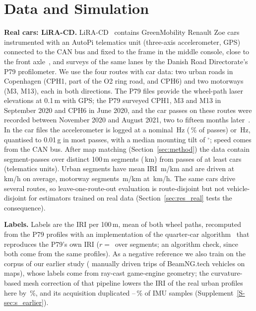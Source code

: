 \section{Data and Simulation}
\label{sec:data}

\textbf{Real cars: LiRA-CD.}
LiRA-CD~\cite{skar2023lira,lira_data} contains GreenMobility Renault Zoe cars instrumented with an AutoPi telematics unit (three-axis accelerometer, GPS) connected to the CAN bus and fixed to the frame in the middle console, close to the front axle~\cite{skar2023lira}, and surveys of the same lanes by the Danish Road Directorate's P79 profilometer.
We use the four routes with car data: two urban roads in Copenhagen (CPH1, part of the O2 ring road, and CPH6) and two motorways (M3, M13), each in both directions.
The P79 files provide the wheel-path laser elevations at 0.1\,m with GPS; the P79 surveyed CPH1, M3 and M13 in September 2020 and CPH6 in June 2020, and the car passes on these routes were recorded between November 2020 and August 2021, two to fifteen months later~\cite{lira_data}.
In the car files the accelerometer is logged at a nominal \liraRateLow\,Hz (\liraRateLowShare\,\% of passes) or \liraRateHigh\,Hz, quantised to 0.01\,g in most passes, with a median mounting tilt of \liraTiltMedian$^\circ$; speed comes from the CAN bus.
After map matching (Section~\ref{sec:method}) the data contain \liraUnits{} segment-passes over \liraSegments{} distinct 100\,m segments (\liraKm\,km) from \liraPasses{} passes of at least \liraDevices{} cars (telematics units).
Urban segments have mean IRI \liraIriUrban\,m/km and are driven at \liraSpeedUrban\,km/h on average, motorway segments \liraIriMotorway\,m/km at \liraSpeedMotorway\,km/h.
The same cars drive several routes, so leave-one-route-out evaluation is route-disjoint but not vehicle-disjoint for estimators trained on real data (Section~\ref{sec:res_real} tests the consequence).

\textbf{Labels.}
Labels are the IRI per 100\,m, mean of both wheel paths, recomputed from the P79 profiles with an implementation of the quarter-car algorithm~\cite{sayers1995iri,astm_e1926} that reproduces the P79's own IRI ($r=$\,\iriValR{} over \iriValN{} segments; an algorithm check, since both come from the same profiles).
As a negative reference we also train on the corpus of our earlier study (\bngTrips{} manually driven trips of \bngCars{} BeamNG.tech vehicles on \bngMaps{} maps), whose labels come from ray-cast game-engine geometry; the curvature-based mesh correction of that pipeline lowers the IRI of the real urban profiles here by \legacyCorrUrbanMape\,\%, and its acquisition duplicated \bngImuDupMin--\bngImuDupMax\,\% of IMU samples (Supplement~\ref{S-sec:s_earlier}).

